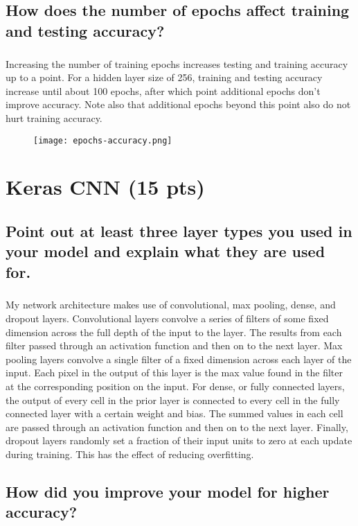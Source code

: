 \documentclass[11pt]{article}
\begin{document}
\subsection{How does the number of epochs affect training and testing accuracy?}

\subparagraph{}

Increasing the number of training epochs increases testing and training accuracy up to a point. For a hidden layer size of 256, training and testing accuracy increase until about 100 epochs, after which point additional epochs don't improve accuracy. Note also that additional epochs beyond this point also do not hurt training accuracy.

\begin{figure}[h]
	\texttt{[image: epochs-accuracy.png]}
	\label{fig:graph}
\end{figure}

\section{Keras CNN (15 pts)}

\subsection{Point out at least three layer types you used in your model and explain what they are used for.}

\subparagraph{}

My network architecture makes use of convolutional, max pooling, dense, and dropout layers. Convolutional layers convolve a series of filters of some fixed dimension across the full depth of the input to the layer. The results from each filter passed through an activation function and then on to the next layer. Max pooling layers convolve a single filter of a fixed dimension across each layer of the input. Each pixel in the output of this layer is the max value found in the filter at the corresponding position on the input. For dense, or fully connected layers, the output of every cell in the prior layer is connected to every cell in the fully connected layer with a certain weight and bias. The summed values in each cell are passed through an activation function and then on to the next layer. Finally, dropout layers randomly set a fraction of their input units to zero at each update during training. This has the effect of reducing overfitting.

\subsection{How did you improve your model for higher accuracy?}
\end{document}
